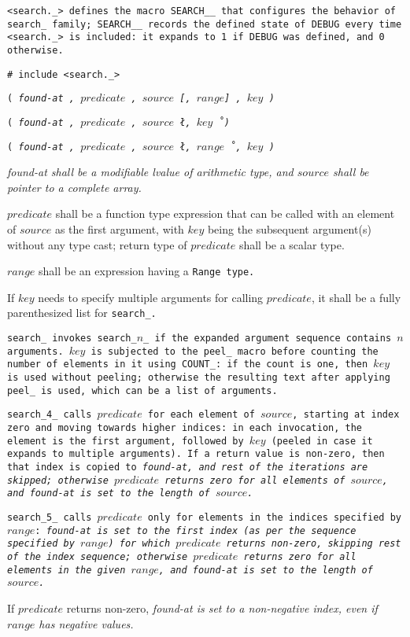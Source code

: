 \tt{<search._>} defines the macro \tt{SEARCH__} that configures the
behavior of \tt{search_} family;  \tt{SEARCH__} records the \tt{defined}
state of \tt{DEBUG} every time \tt{<search._>} is included:
it expands to \tt{1} if \tt{DEBUG} was defined, and \tt{0} otherwise.


\tt{# include <search._>}

\s\s\s\tt{(} \it{found-at} \tt{,}
$predicate$ \tt{,} $source$ [\tt{,} $range$] \tt{,} $key$ \tt{)}

\s\tt{(} \it{found-at} \tt{,}
$predicate$ \tt{,} $source$ \l\tt{,} $key$\r\ \tt{)}

\s\tt{(} \it{found-at} \tt{,}
$predicate$ \tt{,} $source$ \l\tt{,} $range$\r\ \tt{,} $key$ \tt{)}


\it{found-at} shall be a modifiable lvalue of arithmetic type,
and $source$ shall be pointer to a complete array.

$predicate$ shall be a function type expression that can be called with an element
of $source$ as the first argument, with $key$ being the subsequent argument(s)
without any type cast; return type of $predicate$ shall be a scalar type.

$range$ shall be an expression having a \tt{Range} type.

If $key$ needs to specify multiple arguments for calling $predicate$,
it shall be a fully parenthesized list for \tt{search_}.


\tt{search_} invokes \tt{search_}$n$\_ if the
expanded argument sequence contains $n$ arguments.
$key$ is subjected to the \tt{peel_} macro before counting the
number of elements in it using \tt{COUNT_}: if the count is one,
then $key$ is used without peeling; otherwise the resulting text
after applying \tt{peel_} is used, which can be a list of arguments.

\tt{search_4_} calls $predicate$ for each element of $source$,
starting at index zero and moving towards higher indices:
in each invocation, the element is the first argument, followed
by $key$ (peeled in case it expands to multiple arguments).
If a return value is non-zero, then that index is copied to \it{found-at},
and rest of the iterations are skipped; otherwise $predicate$ returns zero for
all elements of $source$, and \it{found-at} is set to the length of $source$.

\tt{search_5_} calls $predicate$ only for elements in the indices specified
by $range$: \it{found-at} is set to the first index (as per the sequence
specified by $range$) for which $predicate$ returns non-zero, skipping rest
of the index sequence; otherwise $predicate$ returns zero for all elements
in the given $range$, and \it{found-at} is set to the length of $source$.

\note If $predicate$ returns non-zero, \it{found-at} is set
to a non-negative index, even if $range$ has negative values.
